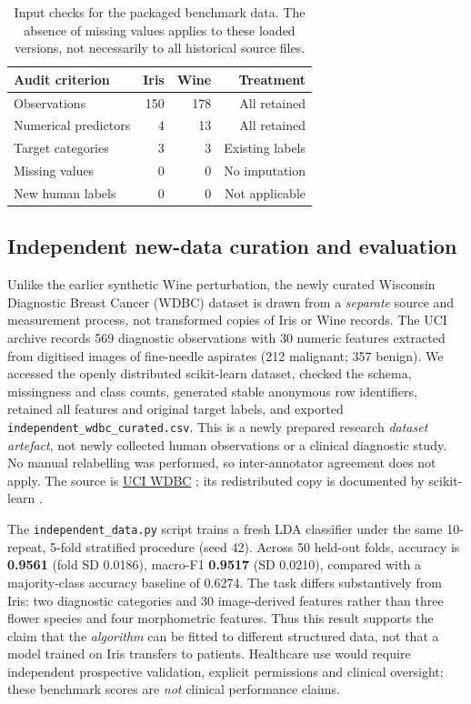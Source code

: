 \documentclass[11pt]{article}
\begin{document}
\begin{table}[t]
\centering\small
\begin{tabular}{lrrr}
\toprule
Audit criterion & Iris & Wine & Treatment \\
\midrule
Observations & 150 & 178 & All retained \\
Numerical predictors & 4 & 13 & All retained \\
Target categories & 3 & 3 & Existing labels \\
Missing values & 0 & 0 & No imputation \\
New human labels & 0 & 0 & Not applicable \\
\bottomrule
\end{tabular}
\caption{Input checks for the packaged benchmark data. The absence of missing values applies to these loaded versions, not necessarily to all historical source files.}
\label{tab:dataset-audit}
\end{table}

\subsection{Independent new-data curation and evaluation}
Unlike the earlier synthetic Wine perturbation, the newly curated Wisconsin Diagnostic Breast Cancer (WDBC) dataset is drawn from a \emph{separate} source and measurement process, not transformed copies of Iris or Wine records. The UCI archive records 569 diagnostic observations with 30 numeric features extracted from digitised images of fine-needle aspirates (212 malignant; 357 benign). We accessed the openly distributed scikit-learn dataset, checked the schema, missingness and class counts, generated stable anonymous row identifiers, retained all features and original target labels, and exported \texttt{independent\_wdbc\_curated.csv}. This is a newly prepared research \emph{dataset artefact}, not newly collected human observations or a clinical diagnostic study. No manual relabelling was performed, so inter-annotator agreement does not apply. The source is \href{https://archive.ics.uci.edu/dataset/17/breast+cancer+wisconsin+diagnostic}{UCI WDBC} \citep{wdbc1995}; its redistributed copy is documented by scikit-learn \citep{pedregosa2011}.

The \texttt{independent\_data.py} script trains a fresh LDA classifier under the same 10-repeat, 5-fold stratified procedure (seed 42). Across 50 held-out folds, accuracy is \textbf{0.9561} (fold SD 0.0186), macro-F1 \textbf{0.9517} (SD 0.0210), compared with a majority-class accuracy baseline of 0.6274. The task differs substantively from Iris: two diagnostic categories and 30 image-derived features rather than three flower species and four morphometric features. Thus this result supports the claim that the \emph{algorithm} can be fitted to different structured data, not that a model trained on Iris transfers to patients. Healthcare use would require independent prospective validation, explicit permissions and clinical oversight; these benchmark scores are \emph{not} clinical performance claims.
\end{document}
